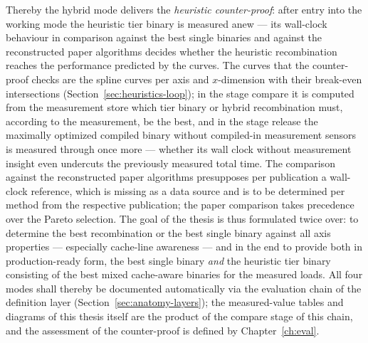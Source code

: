 \begin{nurlang}
Thereby the hybrid mode delivers the \emph{heuristic counter-proof}: after entry into the working mode the
heuristic tier binary is measured anew --- its wall-clock behaviour in comparison against the best
single binaries and against the reconstructed paper algorithms decides whether the heuristic
recombination reaches the performance predicted by the curves. The curves that the counter-proof checks are the
spline curves per axis and $x$-dimension with their break-even intersections
(Section~\ref{sec:heuristics-loop}); in the stage compare it is computed from the measurement store which
tier binary or hybrid recombination must, according to the measurement, be the best, and in the stage release
the maximally optimized compiled binary without compiled-in measurement sensors is measured through once more ---
whether its wall clock without measurement insight even undercuts the previously measured total time. The
comparison against the reconstructed paper algorithms presupposes per publication a wall-clock reference,
which is missing as a data source and is to be determined per method from the respective publication; the paper comparison
takes precedence over the Pareto selection. The goal of the thesis is thus formulated twice over: to determine the
best recombination or the best single binary against all axis properties ---
especially cache-line awareness --- and in the end to provide both in production-ready form,
the best single binary \emph{and} the heuristic tier binary consisting of the best mixed cache-aware binaries for the measured loads. All four modes shall
thereby be documented automatically via the evaluation chain of the definition layer (Section~\ref{sec:anatomy-layers});
the measured-value tables and diagrams of this thesis itself are the product
of the compare stage of this chain, and the assessment of the counter-proof is defined by Chapter~\ref{ch:eval}.

\end{nurlang}
